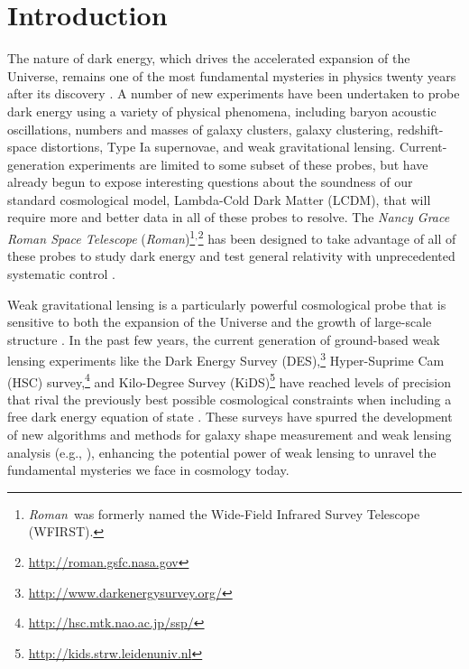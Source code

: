\documentclass[usenatbib]{mnras}
\newcommand{\wfirst}{{\slshape Roman}}
\begin{document}
\section{Introduction}\label{sec:intro}

The nature of dark energy, which drives the accelerated expansion of the Universe, remains one of the most fundamental mysteries in physics twenty years after its discovery \citep{riess98,perlmutter99,detf,Frieman:2008sn,weinberg13}. 
A number of new experiments have been undertaken to probe dark energy using a variety of physical phenomena, including baryon acoustic oscillations, numbers and masses of galaxy clusters, galaxy clustering, redshift-space distortions, Type Ia supernovae, and weak gravitational lensing. 
Current-generation experiments are limited to some subset of these probes, but have already begun to expose interesting questions about the soundness of our standard cosmological model, Lambda-Cold Dark Matter (LCDM), that will require more and better data in all of these probes to resolve. 
The {\slshape Nancy Grace Roman Space Telescope} (\wfirst)\footnote{\wfirst\ was formerly named the Wide-Field Infrared Survey Telescope (WFIRST).}$^,$\footnote{\url{http://roman.gsfc.nasa.gov}} has been designed to take advantage of all of these probes to study dark energy and test general relativity with unprecedented systematic control \citep{2015arXiv150303757S,2019arXiv190205569A,2019BAAS...51c.341D}.

Weak gravitational lensing is a particularly powerful cosmological probe that is sensitive to both the expansion of the Universe and the growth of large-scale structure \citep{2001PhR...340..291B,2017arXiv171003235M}. 
In the past few years, the current generation of ground-based weak lensing experiments like the Dark Energy Survey (DES),\footnote{\url{http://www.darkenergysurvey.org/}} Hyper-Suprime Cam (HSC) survey,\footnote{\url{http://hsc.mtk.nao.ac.jp/ssp/}} and Kilo-Degree Survey (KiDS)\footnote{\url{http://kids.strw.leidenuniv.nl}} have reached levels of precision that rival the previously best possible cosmological constraints when including a free dark energy equation of state \citep{2018arXiv181206076H,2018PhRvD..98d3528T,2019PhRvL.122q1301A,2019PASJ...71...43H}. 
These surveys have spurred the development of new algorithms and methods for galaxy shape measurement and weak lensing analysis (e.g., \citealt{HuffMandelbaum2017,SheldonHuff2017,shearcat}), enhancing the potential power of weak lensing to unravel the fundamental mysteries we face in cosmology today. 
\end{document}
